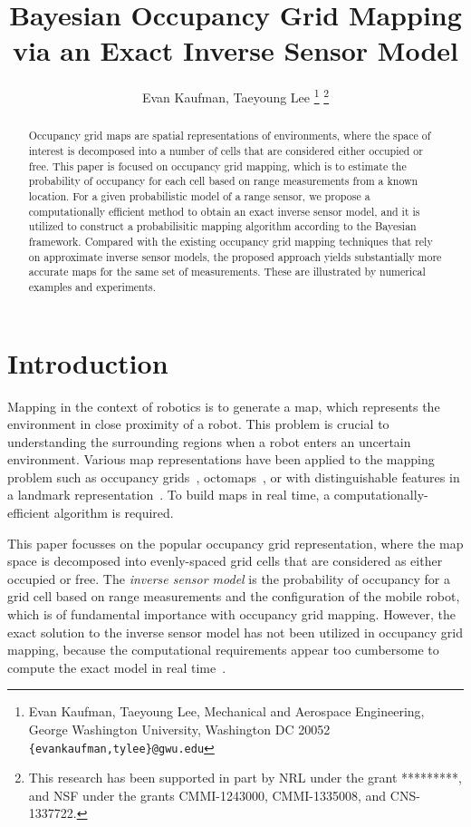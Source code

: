 \documentclass[letterpaper, 10pt, conference]{ieeeconf}
\title{\LARGE \bf
Bayesian Occupancy Grid Mapping via an Exact Inverse Sensor Model}
\author{Evan Kaufman, Taeyoung Lee%
\thanks{Evan Kaufman, Taeyoung Lee, Mechanical and Aerospace Engineering, George Washington University, Washington DC 20052 {\tt \{evankaufman,tylee\}@gwu.edu}}
\thanks{This research has been supported in part by NRL under the grant *********, and NSF under the grants CMMI-1243000, CMMI-1335008, and CNS-1337722.}
}
\newcommand{\EditTL}[1]{{\color{red}\protect #1}}
\begin{document}
\allowdisplaybreaks


\maketitle \thispagestyle{empty} \pagestyle{empty}

\begin{abstract}
Occupancy grid maps are spatial representations of environments, where the space of interest is decomposed into a number of cells that are considered either occupied or free. This paper is focused on occupancy grid mapping, which is to estimate the probability of occupancy for each cell based on range measurements from a known location. For a given probabilistic model of a range sensor, we propose a computationally efficient method to obtain an exact inverse sensor model, and it is utilized to construct a probabilisitic mapping algorithm according to the Bayesian framework. Compared with the existing occupancy grid mapping techniques that rely on approximate inverse sensor models, the proposed approach yields substantially more accurate maps for the same set of measurements. These are illustrated by numerical examples and experiments. 
\end{abstract}

\section{Introduction}

Mapping in the context of robotics is to generate a map, which represents the environment in close proximity of a robot.
This problem is crucial to understanding the surrounding regions when a robot enters an uncertain environment.
Various map representations have been applied to the mapping problem such as occupancy grids~\cite{WolSuk05}, octomaps~\cite{WurHorBenStaBur10}, or with distinguishable features in a landmark representation~\cite{MonThrKolWeg02}.
To build maps in real time, a computationally-efficient algorithm is required.%

This paper focusses on the popular occupancy grid representation, where the map space is decomposed into evenly-spaced grid cells that are considered as either occupied or free.
The \emph{inverse sensor model} is the probability of occupancy for a grid cell based on range measurements and the configuration of the mobile robot, which is of fundamental importance with occupancy grid mapping. However, the exact solution to the inverse sensor model has not been utilized in occupancy grid mapping, because the computational requirements appear too cumbersome to compute the exact model in real time~\cite{ThrBurFox05}.
\end{document}
